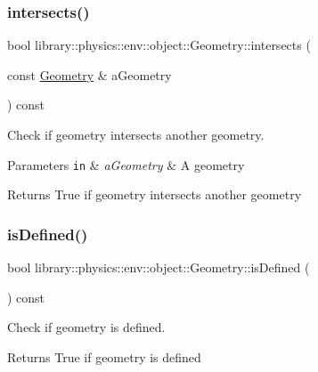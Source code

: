 \subsubsection{\texorpdfstring{intersects()}{intersects()}}
{\footnotesize\ttfamily bool library\+::physics\+::env\+::object\+::\+Geometry\+::intersects (\begin{DoxyParamCaption}\item[{const \hyperlink{classlibrary_1_1physics_1_1env_1_1object_1_1_geometry}{Geometry} \&}]{a\+Geometry }\end{DoxyParamCaption}) const}



Check if geometry intersects another geometry. 


\begin{DoxyParams}[1]{Parameters}
\mbox{\tt in}  & {\em a\+Geometry} & A geometry \\
\hline
\end{DoxyParams}
\begin{DoxyReturn}{Returns}
True if geometry intersects another geometry 
\end{DoxyReturn}
\mbox{\label{classlibrary_1_1physics_1_1env_1_1object_1_1_geometry_a1db567a9a36c4b6878e2d59a633f5a38}} 
\subsubsection{\texorpdfstring{is\+Defined()}{isDefined()}}
{\footnotesize\ttfamily bool library\+::physics\+::env\+::object\+::\+Geometry\+::is\+Defined (\begin{DoxyParamCaption}{ }\end{DoxyParamCaption}) const}



Check if geometry is defined. 

\begin{DoxyReturn}{Returns}
True if geometry is defined 
\end{DoxyReturn}
\mbox{\label{classlibrary_1_1physics_1_1env_1_1object_1_1_geometry_aab7132adf31bf6bd03dcdad46b767765}} 
